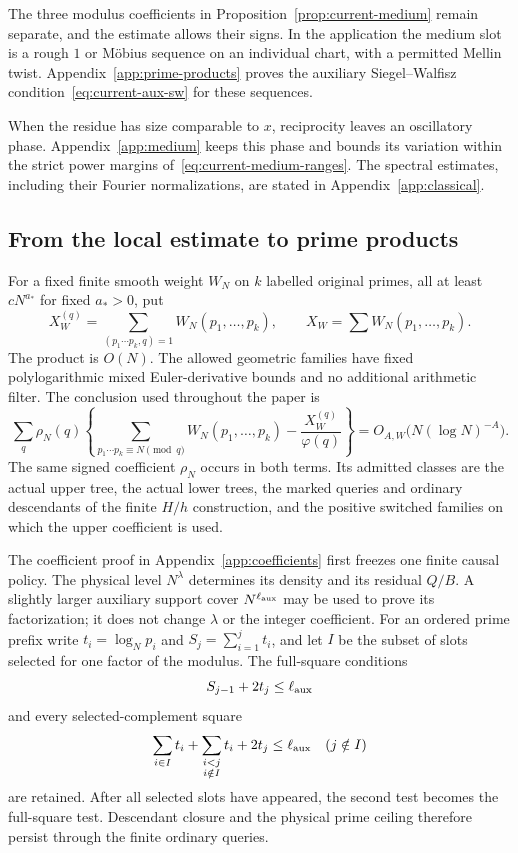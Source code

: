 The three modulus coefficients in
Proposition~\ref{prop:current-medium} remain separate, and the estimate
allows their signs. In the application the medium slot is a rough
$1$ or M\"obius sequence on an individual chart, with a permitted
Mellin twist. Appendix~\ref{app:prime-products} proves the auxiliary
Siegel--Walfisz condition~\eqref{eq:current-aux-sw} for these sequences.

When the residue has size comparable to $x$, reciprocity leaves an
oscillatory phase. Appendix~\ref{app:medium} keeps this phase and bounds
its variation within the strict power margins
of~\eqref{eq:current-medium-ranges}. The spectral estimates, including
their Fourier normalizations, are stated in
Appendix~\ref{app:classical}.

\subsection{From the local estimate to prime products}

For a fixed finite smooth weight $W_N$ on $k$ labelled original primes,
all at least $cN^{a_*}$ for fixed $a_*>0$, put
\[
 X_W^{(q)}=\sum_{(p_1\cdots p_k,q)=1}W_N(p_1,\ldots,p_k),
 \qquad X_W=\sum W_N(p_1,\ldots,p_k).
\]
The product is $O(N)$.  The allowed geometric families have fixed
polylogarithmic mixed Euler-derivative bounds and no additional
arithmetic filter.  The conclusion used throughout the paper is
\begin{equation}
 \sum_q\rho_N(q)
 \left\{\sum_{p_1\cdots p_k\equiv N\pmod q}W_N(p_1,\ldots,p_k)
            -\frac{X_W^{(q)}}{\varphi(q)}\right\}
       =O_{A,W}\bigl(N(\log N)^{-A}\bigr).
 \label{eq:current-PP}
\end{equation}
The same signed coefficient $\rho_N$ occurs in both terms.  Its
admitted classes are the actual upper tree, the actual lower trees,
the marked queries and ordinary descendants of the finite $H/h$
construction, and the positive switched families on which the upper
coefficient is used.

The coefficient proof in Appendix~\ref{app:coefficients} first freezes
one finite causal policy.  The physical level $N^\lambda$ determines
its density and its residual $Q/B$.  A slightly larger auxiliary
support cover $N^{\ell_{\rm aux}}$ may be used to prove its
factorization; it does not change $\lambda$ or the integer coefficient.
For an ordered prime prefix write $t_i=\log_Np_i$ and
$S_j=\sum_{i=1}^jt_i$, and let $I$ be the subset of slots selected
for one factor of the modulus. The full-square conditions
\[
 S_{j-1}+2t_j\le\ell_{\rm aux}
\]
and every selected-complement square
\[
 \sum_{i\in I}t_i+
       \sum_{\substack{i<j\\i\notin I}}t_i+2t_j
       \le\ell_{\rm aux}\quad(j\notin I)
\]
are retained. After all selected slots have appeared, the second test
becomes the full-square test.  Descendant closure and the physical
prime ceiling therefore persist through the finite ordinary queries.

